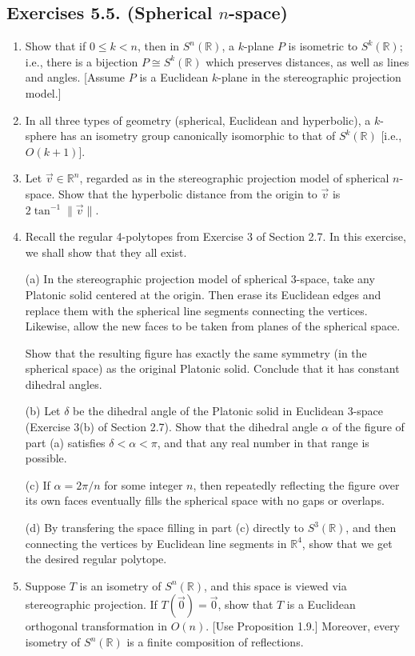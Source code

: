 \documentclass[leqno]{book}
\begin{document}
\subsection*{Exercises 5.5. (Spherical $n$-space)} %
\begin{enumerate}
\item Show that if $0\leqslant k<n$, then in $S^n(\mathbb R)$, a $k$-plane $P$ is isometric to $S^k(\mathbb R)$; i.e., there is a bijection $P\cong S^k(\mathbb R)$ which preserves distances, as well as lines and angles.  [Assume $P$ is a Euclidean $k$-plane in the stereographic projection model.]

\item In all three types of geometry (spherical, Euclidean and hyperbolic), a $k$-sphere has an isometry group canonically isomorphic to that of $S^k(\mathbb R)$ [i.e., $O(k+1)$].

\item Let $\vec v\in\mathbb R^n$, regarded as in the stereographic projection model of spherical $n$-space.  Show that the hyperbolic distance from the origin to $\vec v$ is $2\tan^{-1}\|\vec v\|$.

\item Recall the regular 4-polytopes from Exercise 3 of Section 2.7.  In this exercise, we shall show that they all exist.

(a) In the stereographic projection model of spherical 3-space, take any Platonic solid centered at the origin.  Then erase its Euclidean edges and replace them with the spherical line segments connecting the vertices.  Likewise, allow the new faces to be taken from planes of the spherical space.

Show that the resulting figure has exactly the same symmetry (in the spherical space) as the original Platonic solid.  Conclude that it has constant dihedral angles.

(b) Let $\delta$ be the dihedral angle of the Platonic solid in Euclidean 3-space (Exercise 3(b) of Section 2.7).  Show that the dihedral angle $\alpha$ of the figure of part (a) satisfies $\delta<\alpha<\pi$, and that any real number in that range is possible.

(c) If $\alpha=2\pi/n$ for some integer $n$, then repeatedly reflecting the figure over its own faces eventually fills the spherical space with no gaps or overlaps.

(d) By transfering the space filling in part (c) directly to $S^3(\mathbb R)$, and then connecting the vertices by Euclidean line segments in $\mathbb R^4$, show that we get the desired regular polytope.

\item Suppose $T$ is an isometry of $S^n(\mathbb R)$, and this space is viewed via stereographic projection.  If $T(\vec 0)=\vec 0$, show that $T$ is a Euclidean orthogonal transformation in $O(n)$.  [Use Proposition 1.9.]  Moreover, every isometry of $S^n(\mathbb R)$ is a finite composition of reflections.
\end{enumerate}
\end{document}
